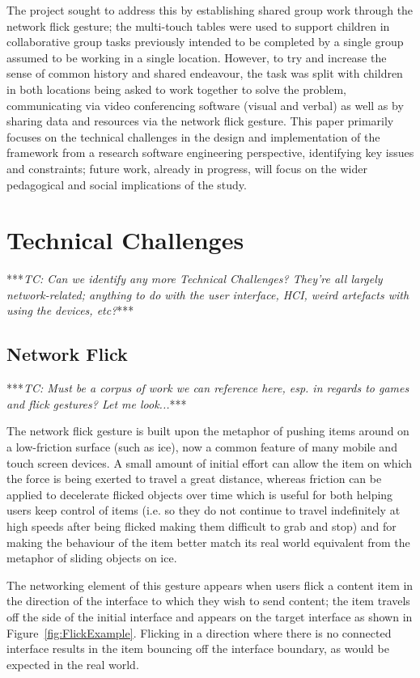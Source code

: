 \documentclass[twocolumn]{svjour3}          %
\begin{document}
The project sought to address this by establishing shared group work through the network flick gesture; the multi-touch tables were used to support children in collaborative group tasks previously intended to be completed by a single group assumed to be working in a single location.
However, to try and increase the sense of common history and shared endeavour, the task was split with children in both locations being asked to work together to solve the problem, communicating via video conferencing software (visual and verbal) as well as by sharing data and resources via the network flick gesture.
This paper primarily focuses on the technical challenges in the design and implementation of the framework from a research software engineering perspective, identifying key issues and constraints; future work, already in progress, will focus on the wider pedagogical and social implications of the study.


\section{Technical Challenges}

***{\emph{TC: Can we identify any more Technical Challenges? They're all largely network-related; anything to do with the user interface, HCI, weird artefacts with using the devices, etc?}}***

\subsection{Network Flick}

***{\emph{TC: Must be a corpus of work we can reference here, esp. in regards to games and flick gestures? Let me look...}}***

The network flick gesture is built upon the metaphor of pushing items around on a low-friction surface (such as ice), now a common feature of many mobile and touch screen devices.
A small amount of initial effort can allow the item on which the force is being exerted to travel a great distance, whereas friction can be applied to decelerate flicked objects over time which is useful for both helping users keep control of items (i.e. so they do not continue to travel indefinitely at high speeds after being flicked making them difficult to grab and stop) and for making the behaviour of the item better match its real world equivalent from the metaphor of sliding objects on ice.

The networking element of this gesture appears when users flick a content item in the direction of the interface to which they wish to send content; the item travels off the side of the initial interface and appears on the target interface as shown in Figure~\ref{fig:FlickExample}.
Flicking in a direction where there is no connected interface results in the item bouncing off the interface boundary, as would be expected in the real world.
\end{document}
